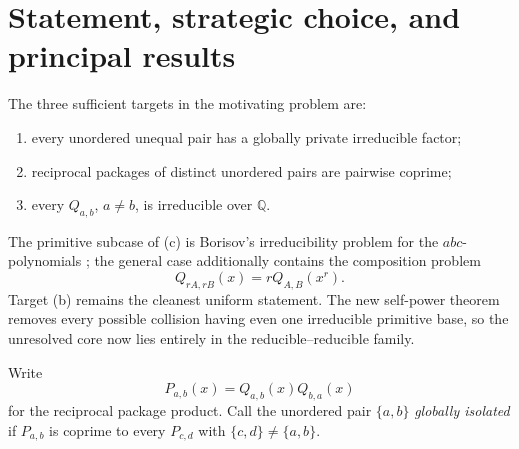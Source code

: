 \documentclass[11pt]{article}
\theoremstyle{definition}
\newcommand{\Q}{\mathbb Q}
\begin{document}
\tableofcontents

\section{Statement, strategic choice, and principal results}

The three sufficient targets in the motivating problem are:
\begin{enumerate}[label=(\alph*)]
\item every unordered unequal pair has a globally private irreducible factor;
\item reciprocal packages of distinct unordered pairs are pairwise coprime;
\item every \(Q_{a,b}\), \(a\neq b\), is irreducible over \(\Q\).
\end{enumerate}
The primitive subcase of (c) is Borisov's irreducibility problem for the
\(abc\)-polynomials \cite{Borisov1998}; the general case additionally contains the composition
problem
\[
 Q_{rA,rB}(x)=rQ_{A,B}(x^r).
\]
Target (b) remains the cleanest uniform statement.  The new self-power theorem
removes every possible collision having even one irreducible primitive base,
so the unresolved core now lies entirely in the reducible--reducible family.

Write
\[
 P_{a,b}(x)=Q_{a,b}(x)Q_{b,a}(x)
\]
for the reciprocal package product.  Call the unordered pair \(\{a,b\}\)
\emph{globally isolated} if \(P_{a,b}\) is coprime to every
\(P_{c,d}\) with \(\{c,d\}\neq\{a,b\}\).
\end{document}
